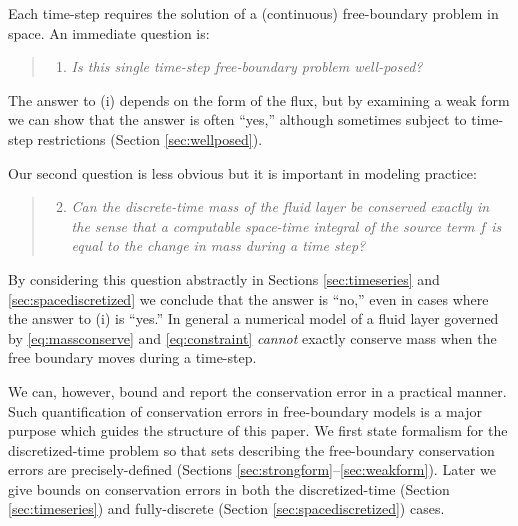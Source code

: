 \documentclass[final,onefignum]{siamart190516}
\begin{document}
Each time-step requires the solution of a (continuous) free-boundary problem in space.  An immediate question is:
  \begin{quote}
  \renewcommand{\labelenumi}{(\roman{enumi})}
  \begin{enumerate}
  \item \emph{Is this single time-step free-boundary problem well-posed?}
  \end{enumerate}
  \end{quote}
The answer to (i) depends on the form of the flux, but by examining a weak form we can show that the answer is often ``yes,'' although sometimes subject to time-step restrictions (Section \ref{sec:wellposed}).

Our second question is less obvious but it is important in modeling practice:
  \begin{quote}
  \renewcommand{\labelenumi}{(\roman{enumi})}
  \begin{enumerate}
  \setcounter{enumi}{1}
  \item \emph{Can the discrete-time mass of the fluid layer be conserved exactly in the sense that a computable space-time integral of the source term $f$ is equal to the change in mass during a time step?}
  \end{enumerate}
  \end{quote}
By considering this question abstractly in Sections \ref{sec:timeseries} and \ref{sec:spacediscretized} we conclude that the answer is ``no,'' even in cases where the answer to (i) is ``yes.''  In general a numerical model of a fluid layer governed by \eqref{eq:massconserve} and \eqref{eq:constraint} \emph{cannot} exactly conserve mass when the free boundary moves during a time-step.

We can, however, bound and report the conservation error in a practical manner.  Such quantification of conservation errors in free-boundary models is a major purpose which guides the structure of this paper.  We first state formalism for the discretized-time problem so that sets describing the free-boundary conservation errors are precisely-defined (Sections \ref{sec:strongform}--\ref{sec:weakform}).  Later we give bounds on conservation errors in both the discretized-time (Section \ref{sec:timeseries}) and fully-discrete (Section \ref{sec:spacediscretized}) cases.
\end{document}
